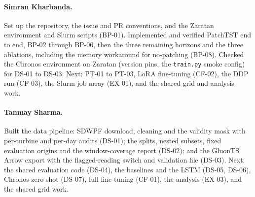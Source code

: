 \documentclass[11pt]{article}
\newcommand{\code}[1]{\texttt{\small #1}}
\begin{document}
\paragraph{Simran Kharbanda.} Set up the repository, the issue and PR conventions, and the Zaratan environment
and Slurm scripts (BP-01). Implemented and verified PatchTST end to end, BP-02 through BP-06, then the three
remaining horizons and the three ablations, including the memory workaround for no-patching (BP-08). Checked the
Chronos environment on Zaratan (version pins, the \code{train.py} smoke config) for DS-01 to DS-03. Next: PT-01 to PT-03, LoRA fine-tuning (CF-02), the DDP run (CF-03), the Slurm job array
(EX-01), and the shared grid and analysis work.

\paragraph{Tanmay Sharma.} Built the data pipeline: SDWPF download, cleaning and the validity mask with
per-turbine and per-day audits (DS-01); the splits, nested subsets, fixed evaluation origins and the
window-coverage report (DS-02); and the GluonTS Arrow export with the flagged-reading switch and validation file
(DS-03). Next: the shared evaluation code (DS-04), the
baselines and the LSTM (DS-05, DS-06), Chronos zero-shot (DS-07), full fine-tuning (CF-01), the analysis (EX-03),
and the shared grid work.
\end{document}
